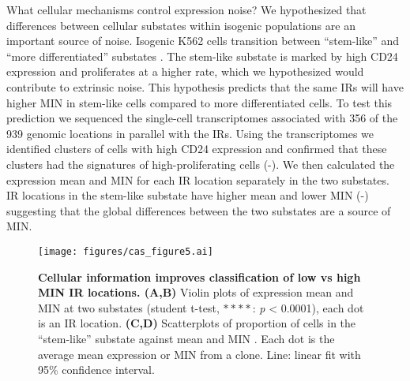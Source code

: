 What cellular mechanisms control expression noise? We hypothesized that differences between cellular substates within isogenic populations are an important source of noise. Isogenic K562 cells transition between \enquote{stem-like} and \enquote{more differentiated} substates \cite{litzenburgerum_changhy:SinglecellEpigenomic2017, moudgila_mitrard:SelfReportingTransposons2020}. The stem-like substate is marked by high CD24 expression and proliferates at a higher rate, which we hypothesized would contribute to extrinsic noise. This hypothesis predicts that the same IRs will have higher MIN in stem-like cells compared to more differentiated cells. To test this prediction we sequenced the single-cell transcriptomes associated with 356 of the 939 genomic locations in parallel with the IRs. Using the transcriptomes we identified clusters of cells with high CD24 expression and confirmed that these clusters had the signatures of high-proliferating cells (-). We then calculated the expression mean and MIN for each IR location separately in the two substates. IR locations in the stem-like substate have higher mean and lower MIN (-) suggesting that the global differences between the two substates are a source of MIN. 

\begin{figure}[tbp]  
    \centering
    \texttt{[image: figures/cas\_figure5.ai]}
    \caption[Cellular information improves classification of MIN IR locations.]{%
        \textbf{Cellular information improves classification of low vs high MIN IR locations. (A,B)}
        Violin plots of expression mean  and MIN  at two substates (student t-test, $\ast\ast\ast\ast$: \textit{p} <  0.0001), each dot is an IR location.
        \textbf{(C,D)}
        Scatterplots of proportion of cells in the \enquote{stem-like} substate against mean  and MIN . Each dot is the average mean expression or MIN from a clone. Line: linear fit with 95\% confidence interval. 
        \legendcontdnote
    }
    \label{fig:cas_figure5}
\end{figure}

